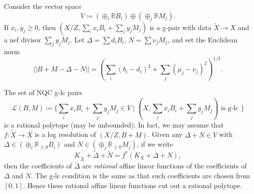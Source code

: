 \documentclass[11pt]{amsart}
\newcommand{\Rr}{\mathbb{R}}
\newcommand{\Ll}{\mathcal{L}}
\begin{document}
Consider the vector space 
\[
V \coloneqq (\oplus_i \Rr B_i) \oplus (\oplus_j \Rr M_j).
\] If $x_i, y_j \geq 0$, then $(X/Z, \sum_i x_i B_i + \sum_j y_j M_j)$ is a g-pair with data $\tilde X \to X$ and a nef divisor $\sum_j y_j \tilde M_j$. Let $\Delta=\sum d_iB_i$, $N=\sum \nu_j M_j$, and set the Euclidean norm
\[
||B+M-\Delta-N||=(\sum_i (b_i-d_i)^2+\sum_j (\mu_j-\nu_j)^2)^{1/2}.
\] 

The set of NQC g-lc pairs
	\[
	\Ll(B,M)\coloneqq \{\sum_i x_i B_i + \sum_j y_j M_j \in V \mid (X, \sum_{i} x_i B_i + \sum_j y_j M_j) \text{~is g-lc~}\}
	\] 
	is a rational polytope (may be unbounded). In fact, we may assume that $f:\tilde{X}\to X$ is a log resolution of $(X/Z,B+M)$. Given any $\Delta+N\in V$ with $\Delta \in (\oplus_i \Rr_{\ge0} B_i)$ and $N \in (\oplus_j \Rr_{\ge0} M_j)$, if we write 
	\[
	K_{\tilde{X}}+\tilde{\Delta}+\tilde{N}=f^{*}(K_X+\Delta+N),
	\]
	then the coefficients of $\tilde{\Delta}$ are \emph{rational} affine linear functions of the coefficients of $\Delta$ and $N$. The g-lc condition is the same as that such coefficients are chosen from $[0,1]$. Hence these rational affine linear functions cut out a rational polytope.
 
\end{document}
